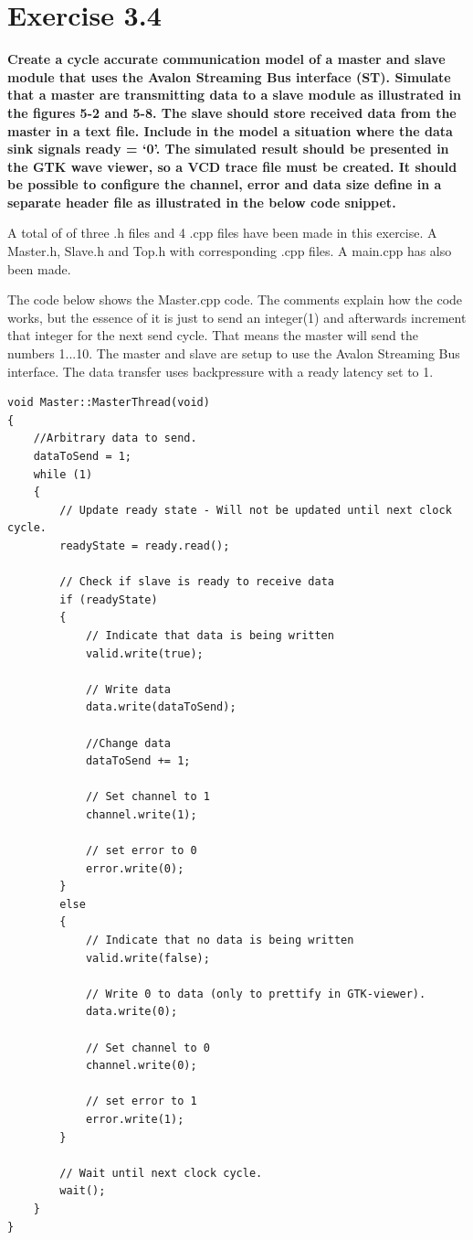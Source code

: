
\chapter{Exercise 3.4}
\textbf{Create a cycle accurate communication model of a master and slave module that uses the
Avalon Streaming Bus interface (ST). Simulate that a master are transmitting data to a slave
module as illustrated in the figures 5-2 and 5-8. The slave should store received data from the master
in a text file. Include in the model a situation where the data sink signals ready = ‘0’. The simulated result
should be presented in the GTK wave viewer, so a VCD trace file must be created. It should be
possible to configure the channel, error and data size define in a separate header file as illustrated
in the below code snippet.}


A total of of three .h files and 4 .cpp files have been made in this exercise. A Master.h, Slave.h and Top.h with corresponding .cpp files. A main.cpp has also been made. 

The code below shows the Master.cpp code. The comments explain how the code works, but the essence of it is just to send an integer(1) and afterwards increment that integer for the next send cycle. That means the master will send the numbers 1...10. The master and slave are setup to use the Avalon Streaming Bus interface. The data transfer uses backpressure with a ready latency set to 1.  



\begin{lstlisting}
void Master::MasterThread(void)
{
	//Arbitrary data to send.
	dataToSend = 1;
	while (1)
	{
		// Update ready state - Will not be updated until next clock cycle.
		readyState = ready.read();
		
		// Check if slave is ready to receive data
		if (readyState)
		{
			// Indicate that data is being written
			valid.write(true);
			
			// Write data
			data.write(dataToSend);
			
			//Change data
			dataToSend += 1;
			
			// Set channel to 1
			channel.write(1);
			
			// set error to 0
			error.write(0);
		}
		else
		{
			// Indicate that no data is being written
			valid.write(false);
			
			// Write 0 to data (only to prettify in GTK-viewer).
			data.write(0);
			
			// Set channel to 0
			channel.write(0);
			
			// set error to 1
			error.write(1);
		}
		
		// Wait until next clock cycle.
		wait();
	}
}
\end{lstlisting}

